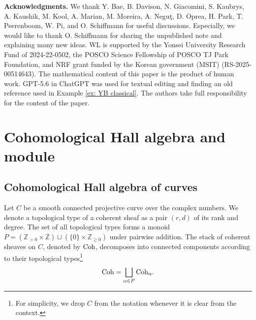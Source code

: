 \documentclass[10pt]{amsart}
\newcommand{\BZ}{\mathbb{Z}}
\newcommand{\Coh}{\textnormal{Coh}}
\newcommand{\+}{{}^+}
\theoremstyle{definition}
\theoremstyle {definition}
\theoremstyle {definition}
\begin{document}
\medskip
\noindent \textbf{Acknowledgments.}
We thank Y. Bae, B. Davison, N. Giacomini, S. Kaubrys, A. Kaushik, M. Kool, A. Marian, M. Moreira, A. Negu\c t, D. Oprea, H. Park, T. Peerenboom, W. Pi, and O. Schiffmann for useful discussions. Especially, we would like to thank O. Schiffmann for sharing the unpublished note \cite{SV_unpublished} and explaining many new ideas. WL is supported by the Yonsei University Research Fund of 2024-22-0502, the POSCO Science Fellowship of POSCO TJ Park Foundation, and NRF
grant funded by the Korean government (MSIT) (RS-2025-00514643). The mathematical content of this paper is the product of human work. GPT-5.6 in ChatGPT was used for textual editing and finding an old reference \cite{LLT} used in Example \ref{ex: YB classical}. The authors take full responsibility for the content of the paper.


\section{Cohomological Hall algebra and module}

\subsection{Cohomological Hall algebra of curves}





Let $C$ be a smooth connected projective curve over the complex numbers. We denote a topological type of a coherent sheaf as a pair $(r,d)$ of its rank and degree. The set of all topological types forms a monoid $P=(\BZ_{>0}\times \BZ)\sqcup(\{0\}\times\BZ_{\geq 0})$ under pairwise addition. The stack of coherent sheaves on $C$, denoted by $\Coh$, decomposes into connected components according to their topological types\footnote{For simplicity, we drop $C$ from the notation whenever it is clear from the context.}
$$\Coh=\bigsqcup_{\alpha\in P}\Coh_{\alpha}.
$$
\end{document}
